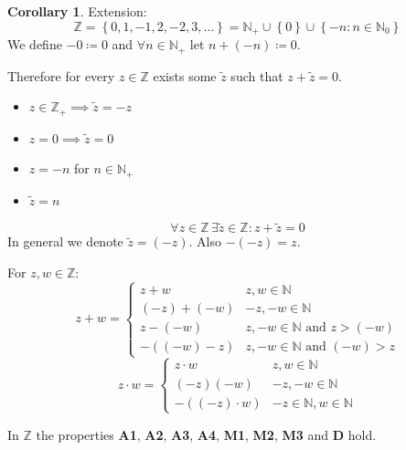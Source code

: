 \documentclass[a4paper,landscape,twocolumn]{article}
\theoremstyle{definition}
\newtheorem{cor}{Corollary}
\newcommand\set[1]{\left\{#1\right\}}
\begin{document}
\begin{cor}
  Extension:
  \[ \mathbb{Z} = \set{0, 1, -1, 2, -2, 3, \ldots} = \mathbb{N}_+ \cup \set{0} \cup \set{-n: n \in \mathbb N_0} \]
  We define $-0 \coloneqq 0$ and $\forall n \in \mathbb{N}_+$ let $n + (-n) \coloneqq 0$.

  Therefore for every $z \in \mathbb{Z}$ exists some $\tilde z$ such that $z + \tilde z = 0$.
  \begin{itemize}
    \item $z \in \mathbb{Z}_+ \implies \tilde z = -z$
    \item $z = 0 \implies \tilde z = 0$
    \item $z = -n$ for $n \in \mathbb{N}_+$
    \item $\tilde z = n$
  \end{itemize}
  \[ \forall z \in \mathbb{Z} \, \exists \tilde z \in \mathbb{Z}: z + \tilde z = 0 \]
  In general we denote $\tilde z = (-z)$.
  Also $-(-z) = z$.

  For $z,w \in \mathbb{Z}$:
  \[
    z + w =
    \begin{cases}
      z + w       & z,w \in \mathbb{N} \\
      (-z) + (-w) & -z, -w \in \mathbb{N} \\
      z - (-w)    & z, -w \in \mathbb{N} \text{ and } z > (-w) \\
      -((-w) - z) & z, -w \in \mathbb{N} \text{ and } (-w) > z
    \end{cases}
  \] \[
    z\cdot w =
    \begin{cases}
      z \cdot w       & z,w \in \mathbb{N} \\
      (-z)(-w)        & -z, -w \in \mathbb{N} \\
      -((-z) \cdot w) & -z \in \mathbb{N}, w \in \mathbb{N}
    \end{cases}
  \]

  In $\mathbb{Z}$ the properties \textbf{A1}, \textbf{A2}, \textbf{A3}, \textbf{A4},
  \textbf{M1}, \textbf{M2}, \textbf{M3} and \textbf{D} hold.
\end{cor}
\end{document}
